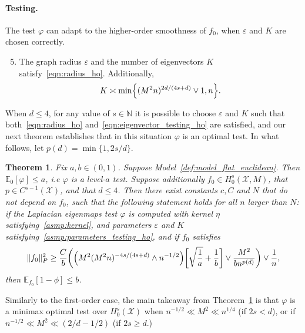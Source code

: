 \documentclass{article}
\newcommand{\1}{\mathbf{1}}
\newcommand{\mc}[1]{\mathcal{#1}}
\newcommand{\Ebb}{\mathbb{E}}
\theoremstyle{alden}
\theoremstyle{aldenthm}
\newtheorem{theorem}{Theorem}
\theoremstyle{definition}
\theoremstyle{remark}
\begin{document}
\paragraph{Testing.} The test $\varphi$ can adapt to the higher-order smoothness of $f_0$, when $\varepsilon$ and $K$ are chosen correctly.
\begin{enumerate}[label=(A\arabic*)]
	\setcounter{enumi}{4}
	\item 
	\label{asmp:parameters_testing_ho}
	The graph radius $\varepsilon$ and the number of eigenvectors $K$ satisfy~\eqref{eqn:radius_ho}. Additionally,
	\begin{equation}
	\label{eqn:eigenvector_testing_ho}
	K \asymp \min\Bigl\{(M^2n)^{2d/(4s + d)} \vee 1, n\Bigr\}.
	\end{equation}
\end{enumerate}
When $d \leq 4$, for any value of $s \in \mathbb{N}$ it is possible to choose $\varepsilon$ and $K$ such that both~\eqref{eqn:radius_ho} and~\eqref{eqn:eigenvector_testing_ho} are satisfied, and our next theorem establishes that in this situation $\varphi$ is an optimal test. In what follows, let $p(d) = \min\{1,2s/d\}$. 
\begin{theorem}
	\label{thm:laplacian_eigenmaps_testing_ho}
	Fix $a,b \in (0,1)$. Suppose Model~\ref{def:model_flat_euclidean}. Then $\mathbb{E}_0[\varphi] \leq a$, i.e $\varphi$ is a level-$a$ test. Suppose additionally $f_0 \in H_0^s(\mc{X},M)$, that $p \in C^{s-1}(\mc{X})$, and that $d \leq 4$. Then there exist constants $c,C$ and $N$ that do not depend on $f_0$, such that the following statement holds for all $n$ larger than $N$: if the Laplacian eigenmaps test $\varphi$ is computed with kernel $\eta$ satisfying~\ref{asmp:kernel}, and parameters $\varepsilon$ and $K$ satisfying~\ref{asmp:parameters_testing_ho}, and if $f_0$ satisfies
	\begin{equation}
	\label{eqn:laplacian_eigenmaps_testing_criticalradius_ho}
	\|f_0\|_P^2 \geq \frac{C}{b}\biggl(\Bigl(M^2(M^2n)^{-4s/(4s + d) } \wedge n^{-1/2}\Bigr)\biggl[\sqrt{\frac{1}{a}} + \frac{1}{b}\biggr] \vee \frac{M^2}{b n^{p(d)}} \biggr) \vee \frac{1}{n},
	\end{equation}
	then $\Ebb_{f_0}[1 - \phi] \leq b$.
\end{theorem}
Similarly to the first-order case, the main takeaway from Theorem~\ref{thm:laplacian_eigenmaps_testing_ho} is that $\varphi$ is a minimax optimal test over $H_0^s(\mc{X})$ when $n^{-1/2} \ll M^2 \ll n^{1/4}$ (if $2s < d$), or if $n^{-1/2} \ll M^2 \ll (2/d - 1/2)$ (if $2s \geq d$.)
\end{document}

